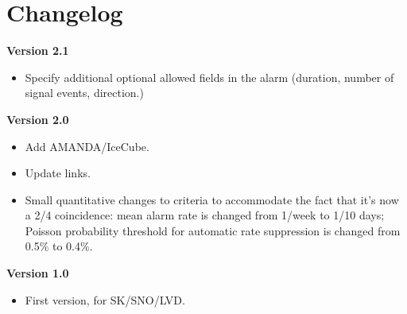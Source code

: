 \documentclass{article}
\begin{document}
                                         
\section{Changelog}

\textbf{Version 2.1}
\begin{itemize}
\item Specify additional optional allowed fields in the alarm (duration, number
of signal events, direction.)
\end{itemize}

\noindent
\textbf{Version 2.0}
\begin{itemize}
\item Add AMANDA/IceCube.
\item Update links.
\item Small quantitative changes to criteria to accommodate the fact that it's
now a 2/4 coincidence:  mean alarm rate is changed from 1/week to 1/10
days; Poisson probability threshold for automatic rate suppression 
is changed from 0.5\% to 0.4\%.  
\end{itemize}

\noindent
\textbf{Version 1.0}
\begin{itemize}
\item First version, for SK/SNO/LVD.
\end{itemize}
\end{document}
